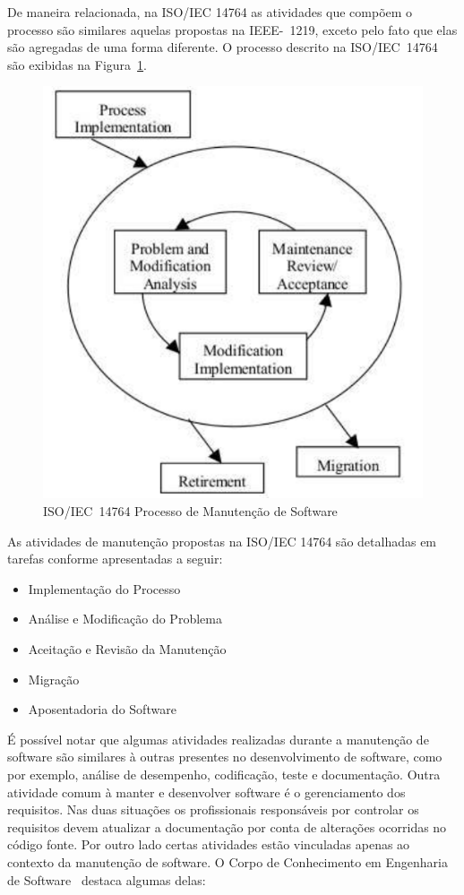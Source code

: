 De maneira relacionada, na ISO/IEC 14764 as atividades que compõem o processo
são similares aquelas propostas na IEEE-~1219, exceto pelo fato que elas são
agregadas de uma forma diferente. O processo descrito na ISO/IEC~14764 são
exibidas na Figura~\ref{fig:ieee-14764-processo-manutencao}.

\begin{figure}[htpb] \centering
	\includegraphics[width=0.7\linewidth]
{chapter-manutencao-software-visao-geral/img/ieee-14764-processo-manutencao.pdf}
	\caption{ISO/IEC~14764 Processo de Manutenção de Software}
\label{fig:ieee-14764-processo-manutencao} \end{figure}

As atividades de manutenção propostas na ISO/IEC 14764 são detalhadas em tarefas
conforme apresentadas a seguir:

\begin{itemize}
   	\item Implementação do Processo
   	\item Análise e Modificação do
		Problema
	\item Aceitação e Revisão da Manutenção
   	\item Migração
   	\item Aposentadoria do Software
\end{itemize}

É possível notar que algumas atividades realizadas durante a manutenção de
software são similares à outras presentes no desenvolvimento de software, como
por exemplo, análise de desempenho, codificação, teste e documentação. Outra
atividade comum à manter e desenvolver software é o gerenciamento dos
requisitos. Nas duas situações os profissionais responsáveis por controlar os
requisitos devem atualizar a do\-cu\-men\-ta\-ção  por conta de alterações
ocorridas no código fonte. Por outro lado certas atividades estão vinculadas
apenas ao contexto da manutenção de software. O Corpo de Conhecimento em
Engenharia de Software~\cite{4425813} destaca algumas delas:

